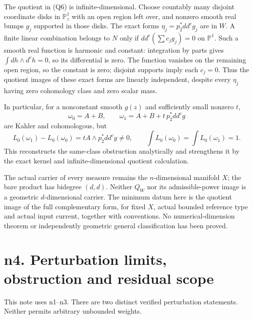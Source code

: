 \documentclass[
  11pt,
]{article}
\begin{document}
The quotient in (Q6) is infinite-dimensional. Choose countably many
disjoint coordinate disks in \(\mathbb{P}^1_z\) with an open region left
over, and nonzero smooth real bumps \(g_j\) supported in those disks.
The exact forms \(\eta_j=p_2^*dd^cg_j\) are in \(W\). A finite linear
combination belongs to \(N\) only if \(dd^c(\sum c_jg_j)=0\) on
\(\mathbb{P}^1\). Such a smooth real function is harmonic and constant:
integration by parts gives \(\int dh\wedge d^ch=0\), so its differential
is zero. The function vanishes on the remaining open region, so the
constant is zero; disjoint supports imply each \(c_j=0\). Thus the
quotient images of these exact forms are linearly independent, despite
every \(\eta_j\) having zero cohomology class and zero scalar mass.

In particular, for a nonconstant smooth \(g(z)\) and sufficiently small
nonzero \(t\), \[
\omega_0=A+B,\qquad\omega_1=A+B+t\,p_2^*dd^cg
\] are Kahler and cohomologous, but \[
L_0(\omega_1)-L_0(\omega_0)=tA\wedge p_2^*dd^cg\ne0,
\qquad\int L_0(\omega_0)=\int L_0(\omega_1)=1.
\] This reconstructs the same-class obstruction analytically and
strengthens it by the exact kernel and infinite-dimensional quotient
calculation.

The actual carrier of every measure remains the \(n\)-dimensional
manifold \(X\); the bare product has bidegree \((d,d)\). Neither \(Q_W\)
nor its admissible-power image is a geometric \(d\)-dimensional carrier.
The minimum datum here is the quotient image of the full complementary
form, for fixed \(X\), actual bounded reference type and actual input
current, together with conventions. No numerical-dimension theorem or
independently geometric general classification has been proved.

\section{n4. Perturbation limits, obstruction and residual
scope}\label{n4.-perturbation-limits-obstruction-and-residual-scope}

This note uses n1--n3. There are two distinct verified perturbation
statements. Neither permits arbitrary unbounded weights.
\end{document}
